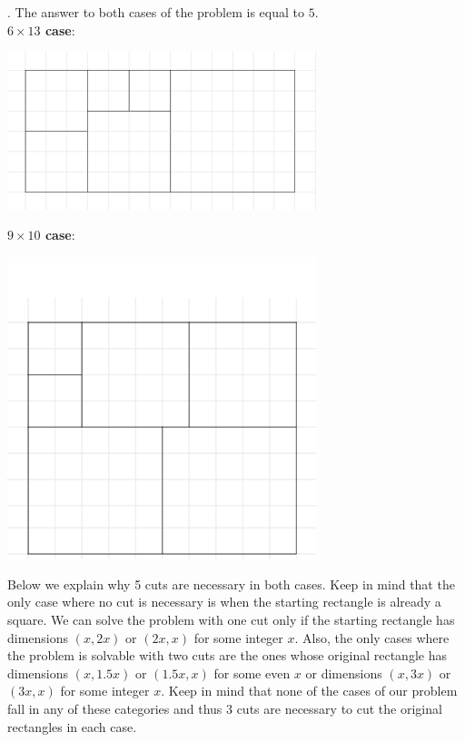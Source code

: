\begin{solution}.
The answer to both cases of the problem is equal to $5$.\\[0.2cm]
\noindent \textbf{$6 \times 13$ case}: 
\begin{center}
	\includegraphics[width=9cm]{47/figs/47_sol1.png}
\end{center}
\noindent \textbf{$9 \times 10$ case}: 
\begin{center}
	\includegraphics[width=9cm]{47/figs/47_sol2.png}
\end{center}
Below we explain why 5 cuts are necessary in both cases. Keep in mind that the only case where no cut is necessary is when the starting rectangle is already a square. We can solve the problem with one cut only if the starting rectangle has dimensions $(x,2x)$ or $(2x,x)$ for some integer $x$. Also, the only cases where the problem is solvable with two cuts are the ones whose original rectangle has dimensions $(x,1.5x)$ or $(1.5x, x)$ for some even $x$ or dimensions $(x,3x)$ or $(3x,x)$ for some integer $x$. Keep in mind that none of the cases of our problem fall in any of these categories and thus 3 cuts are necessary to cut the original rectangles in each case.


\end{solution}
